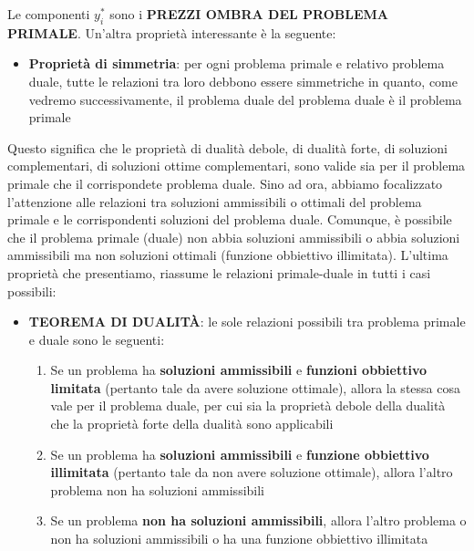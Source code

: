 \documentclass[12pt]{article}
\begin{document}
Le componenti $y_i^*$ sono i \textbf{PREZZI OMBRA DEL PROBLEMA PRIMALE}.
Un'altra proprietà interessante è la seguente:
\begin{itemize}
    \item \textbf{Proprietà di simmetria}: per ogni problema primale e relativo problema duale, tutte le relazioni tra loro debbono essere simmetriche in quanto, come vedremo successivamente, il problema duale del problema duale è il problema primale
\end{itemize}
Questo significa che le proprietà di dualità debole, di dualità forte, di soluzioni complementari, di soluzioni ottime complementari, sono valide sia per il problema primale che il corrispondete problema duale.
Sino ad ora, abbiamo focalizzato l'attenzione alle relazioni tra soluzioni ammissibili o ottimali del problema primale e le corrispondenti soluzioni del problema duale.
Comunque, è possibile che il problema primale (duale) non abbia soluzioni ammissibili o abbia soluzioni ammissibili ma non soluzioni ottimali (funzione obbiettivo illimitata).
L'ultima proprietà che presentiamo, riassume le relazioni primale-duale in tutti i casi possibili:
\begin{itemize}
    \item \textbf{TEOREMA DI DUALITÀ}: le sole relazioni possibili tra problema primale e duale sono le seguenti:
    \begin{enumerate}
        \item Se un problema ha \textbf{soluzioni ammissibili} e \textbf{funzioni obbiettivo limitata} (pertanto tale da avere soluzione ottimale), allora la stessa cosa vale per il problema duale, per cui sia la proprietà debole della dualità che la proprietà forte della dualità sono applicabili
        \item Se un problema ha \textbf{soluzioni ammissibili} e \textbf{funzione obbiettivo illimitata} (pertanto tale da non avere soluzione ottimale), allora l'altro problema non ha soluzioni ammissibili
        \item Se un problema \textbf{non ha soluzioni ammissibili}, allora l'altro problema o non ha soluzioni ammissibili o ha una funzione obbiettivo illimitata
    \end{enumerate}
\end{itemize}
\end{document}
